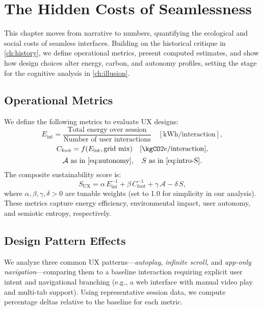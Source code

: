 \documentclass[openany]{book}
\newcommand{\Sent}{S} %
\newcommand{\Eint}{E_{\mathrm{int}}} %
\newcommand{\Cfoot}{C_{\mathrm{foot}}} %
\newcommand{\Auton}{\mathcal{A}} %
\newcommand{\SUX}{S_{\mathrm{UX}}} %
\newcommand{\kWh}{\mathrm{kWh}}
\begin{document}
\chapter{The Hidden Costs of Seamlessness}
\label{ch:hidden-costs}

This chapter moves from narrative to numbers, quantifying the ecological and social costs of seamless interfaces. Building on the historical critique in \cref{ch:history}, we define operational metrics, present computed estimates, and show how design choices alter energy, carbon, and autonomy profiles, setting the stage for the cognitive analysis in \cref{ch:illusion}.

\section{Operational Metrics}
\label{sec:metrics-def}
We define the following metrics to evaluate UX designs:
\begin{equation}
\Eint = \frac{\text{Total energy over session}}{\text{Number of user interactions}} \quad [\kWh/\text{interaction}],
\end{equation}
\begin{equation}
\Cfoot = f(\Eint, \text{grid mix}) \quad [\kgCO2e/\text{interaction}],
\end{equation}
\begin{equation}
\Auton \text{ as in \cref{eq:autonomy}}, \quad \Sent \text{ as in \cref{eq:intro-S}}.
\end{equation}
The composite sustainability score is:
\begin{equation}
\label{eq:SUX}
\SUX = \alpha\,\Eint^{-1} + \beta\,\Cfoot^{-1} + \gamma\,\Auton - \delta\,\Sent,
\end{equation}
where $\alpha, \beta, \gamma, \delta > 0$ are tunable weights (set to 1.0 for simplicity in our analysis). These metrics capture energy efficiency, environmental impact, user autonomy, and semiotic entropy, respectively.

\section{Design Pattern Effects}
\label{sec:pattern-effects}
We analyze three common UX patterns---\emph{autoplay}, \emph{infinite scroll}, and \emph{app-only navigation}---comparing them to a baseline interaction requiring explicit user intent and navigational branching (e.g., a web interface with manual video play and multi-tab support). Using representative session data, we compute percentage deltas relative to the baseline for each metric.
\end{document}
